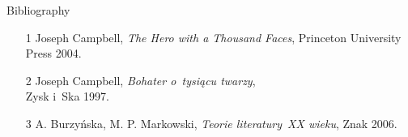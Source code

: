 \documentclass{beamer}  %
\begin{document}
\begin{frame}

  \begin{block}{Bibliography}
    \begin{itemize}
    \item[1] Joseph Campbell, \emph{The Hero with a Thousand Faces},
      Princeton University Press 2004.
    \item[2] Joseph Campbell, \emph{Bohater o~tysiącu twarzy}, \\ Zysk
      i~Sk\dywiz a 1997.
    \item[3] A. Burzyńska, M. P. Markowski, \emph{Teorie literatury~XX
        wieku}, Znak 2006.
    \end{itemize}
  \end{block}

\end{frame}





 {}



\end{document}
